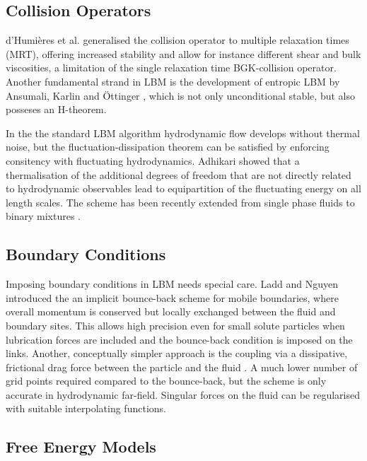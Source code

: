 \documentclass[8.5pt,twoside,twocolumn]{article}
\begin{document}
\subsection{Collision Operators}

d'Humi\`eres et al. \cite{dHumieres:2002} generalised the collision operator to multiple relaxation times (MRT), 
offering increased stability and allow for instance different shear and bulk viscosities, a limitation of 
the single relaxation time BGK-collision operator.    
Another fundamental strand in LBM is the development of entropic LBM by Ansumali, Karlin 
and \"Ottinger \cite{Ansumali:2003}, which is not only unconditional stable, but also posseses an
H-theorem.

In the the standard LBM algorithm hydrodynamic flow develops without thermal noise, but 
the fluctuation-dissipation theorem can be satisfied by enforcing consitency with 
fluctuating hydrodynamics. Adhikari \cite{Adhikari:2005} showed that a thermalisation of 
the additional degrees of freedom that are not directly related to hydrodynamic observables 
lead to equipartition of the fluctuating energy on all length scales. The scheme has been 
recently extended from single phase fluids \cite{Duenweg:2007} to binary mixtures \cite{Gross:2010}.

\subsection{Boundary Conditions}

Imposing boundary conditions in LBM needs special care. Ladd and Nguyen \cite{Nguyen:2002} 
introduced the an implicit bounce-back scheme for mobile boundaries, where overall momentum is conserved but 
locally exchanged between the fluid and boundary sites. This allows high precision even 
for small solute particles when lubrication forces are included and the bounce-back condition 
is imposed on the links. Another, conceptually simpler approach is the coupling via a dissipative, 
frictional drag force between the particle and the fluid \cite{Ahlrichs:1999}. 
A much lower number of grid points required compared to the bounce-back, but the scheme is only accurate in 
hydrodynamic far-field. Singular forces on the fluid can be regularised with suitable interpolating functions.  


\subsection{Free Energy Models}
\end{document}
